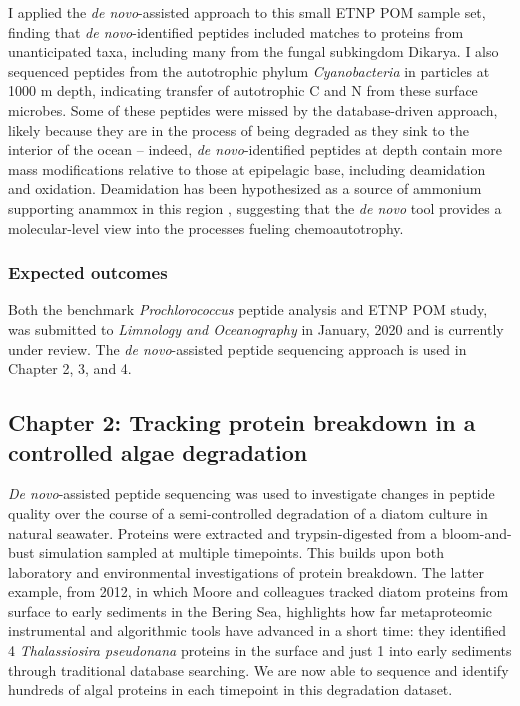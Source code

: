 \documentclass[12pt, letterpaper, twoside]{article}
\begin{document}
I applied the \textit{de novo}-assisted approach to this small ETNP POM sample set, finding that \textit{de novo}-identified peptides included matches to proteins from unanticipated taxa, including many from the fungal subkingdom Dikarya. I also sequenced peptides from the autotrophic phylum \textit{Cyanobacteria} in particles at 1000 m depth, indicating transfer of autotrophic C and N from these surface microbes. Some of these peptides were missed by the database-driven approach, likely because they are in the process of being degraded as they sink to the interior of the ocean – indeed, \textit{de novo}-identified peptides at depth contain more mass modifications relative to those at epipelagic base, including deamidation and oxidation. Deamidation has been hypothesized as a source of ammonium supporting anammox in this region \cite{van_mooy_impact_2002}, suggesting that the \textit{de novo} tool provides a molecular-level view into the processes fueling chemoautotrophy.

\subsubsection*{Expected outcomes}

Both the benchmark \textit{Prochlorococcus} peptide analysis and ETNP POM study, was submitted to \textit{Limnology and Oceanography} in January, 2020 and is currently under review. The \textit{de novo}-assisted peptide sequencing approach is used in Chapter 2, 3, and 4. 

\subsection{Chapter 2: Tracking protein breakdown in a controlled algae degradation}

\textit{De novo}-assisted peptide sequencing was used to investigate changes in peptide quality over the course of a semi-controlled degradation of a diatom culture in natural seawater. Proteins were extracted and trypsin-digested from a bloom-and-bust simulation sampled at multiple timepoints. This builds upon both laboratory \cite{nunn_path_2010} and environmental investigations \cite{moore_identifying_2012} of protein breakdown. The latter example, from 2012, in which Moore and colleagues tracked diatom proteins from surface to early sediments in the Bering Sea, highlights how far metaproteomic instrumental and algorithmic tools have advanced in a short time: they identified 4 \textit{Thalassiosira pseudonana} proteins in the surface and just 1 into early sediments through traditional database searching. We are now able to sequence and identify hundreds of algal proteins in each timepoint in this degradation dataset. 
\end{document}
